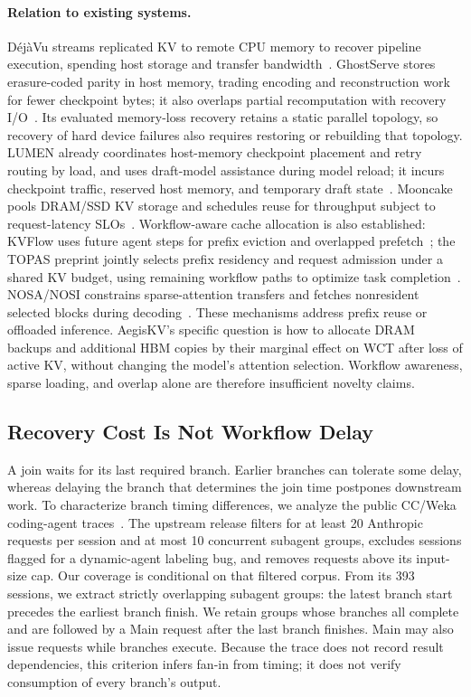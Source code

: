 \paragraph{Relation to existing systems.}
D\'{e}j\`{a}Vu streams replicated KV to remote CPU memory to recover
pipeline execution, spending host storage and transfer
bandwidth~\cite{strati2024dejavu}. GhostServe stores erasure-coded parity
in host memory, trading encoding and reconstruction work for fewer
checkpoint bytes; it also overlaps partial recomputation with recovery
I/O~\cite{jayakody2026ghostserve}. Its evaluated memory-loss recovery
retains a static parallel topology, so recovery of hard device failures
also requires restoring or rebuilding that topology.
LUMEN already coordinates host-memory checkpoint placement and retry
routing by load, and uses draft-model assistance during model reload;
it incurs checkpoint traffic, reserved host memory, and temporary draft
state~\cite{cao2026lumen}. Mooncake pools DRAM/SSD KV storage and schedules
reuse for throughput subject to request-latency SLOs~\cite{qin2025mooncake}.
Workflow-aware cache allocation is also established: KVFlow uses future
agent steps for prefix eviction and overlapped
prefetch~\cite{pan2025kvflow}; the TOPAS preprint jointly selects prefix
residency and request admission under a shared KV budget, using remaining
workflow paths to optimize task completion~\cite{ni2026topas}.
NOSA/NOSI constrains sparse-attention transfers and fetches nonresident
selected blocks during decoding~\cite{huang2026nosav2}.
These mechanisms address prefix reuse or offloaded inference. AegisKV's
specific question is how to allocate DRAM backups and additional HBM
copies by their marginal effect on WCT after loss of active KV, without
changing the model's attention selection. Workflow awareness, sparse
loading, and overlap alone are therefore insufficient novelty claims.

\subsection{Recovery Cost Is Not Workflow Delay}
\label{sec:motivation-workflow}

A join waits for its last required branch. Earlier branches can tolerate
some delay, whereas delaying the branch that determines the join time
postpones downstream work. To characterize branch timing differences, we
analyze the public CC/Weka coding-agent
traces~\cite{semianalysis2026cctraces}. The upstream release filters for
at least 20 Anthropic requests per session and at most 10 concurrent
subagent groups, excludes sessions flagged for a dynamic-agent labeling
bug, and removes requests above its input-size cap. Our coverage is
conditional on that filtered corpus. From its 393 sessions, we extract
strictly overlapping subagent groups: the latest branch start precedes
the earliest branch finish. We retain groups whose branches all complete
and are followed by a Main request after the last branch finishes.
Main may also issue requests while branches execute. Because the trace
does not record result dependencies, this criterion infers fan-in from
timing; it does not verify consumption of every branch's output.

